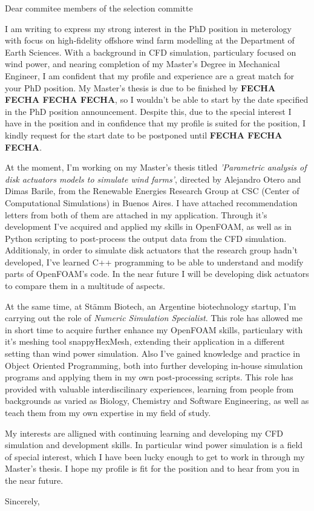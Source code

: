 \documentclass{letter}
\newcommand{\thesisname}{Parametric analysis of disk actuators models to simulate wind farms}
\begin{document}
\begin{letter}{}
\opening{Dear commitee members of the selection committe}

I am writing to express my strong interest in the PhD position in meterology with focus on high-fidelity offshore wind farm modelling at the Department of Earth Sciences.
  With a background in CFD simulation, particulary focused on wind power, and nearing completion of my Master's Degree in Mechanical Engineer, I am confident that my profile and experience are a great match for your PhD position.
  My Master's thesis is due to be finished by \textbf{FECHA FECHA FECHA FECHA}, so I wouldn't be able to start by the date specified in the PhD position announcement.
  Despite this, due to the special interest I have in the position and in confidence that my profile is suited for the position, I kindly request for the start date to be postponed until \textbf{FECHA FECHA FECHA}.

  At the moment, I'm working on my Master's thesis titled \textit{'\thesisname'}, directed by Alejandro Otero and Dimas Barile, from the Renewable Energies Research Group at CSC (Center of Computational Simulations) in Buenos Aires.
  I have attached recommendation letters from both of them are attached in my application.
  Through it's development I've acquired and applied my skills in OpenFOAM, as well as in Python scripting to post-process the output data from the CFD simulation.
  Additionaly, in order to simulate disk actuators that the research group hadn't developed, I've learned C++ programming to be able to understand and modify parts of OpenFOAM's code.
  In the near future I will be developing disk actuators to compare them in a multitude of aspects.

  At the same time, at Stämm Biotech, an Argentine biotechnology startup, I'm carrying out the role of \textit{Numeric Simulation Specialist}.
  This role has allowed me in short time to acquire further enhance my OpenFOAM skills, particulary with it's meshing tool snappyHexMesh, extending their application in a different setting than wind power simulation.
  Also I've gained knowledge and practice in Object Oriented Programming, both into further developing in-house simulation programs and applying them in my own post-processing scripts.
  This role has provided with valuable interdiscilinary experiences, learning from people from backgrounds as varied as Biology, Chemistry and Software Engineering, as well as teach them from my own expertise in my field of study.

My interests are alligned with continuing learning and developing my CFD simulation and development skills.
  In particular wind power simulation is a field of special interest, which I have been lucky enough to get to work in through my Master's thesis.
  I hope my profile is fit for the position and to hear from you in the near future.
\closing{Sincerely,}
\end{letter}
\end{document}
